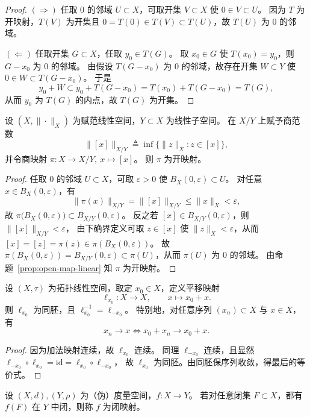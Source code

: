 \documentclass[lang=cn,a4paper,newtx,section]{elegantbook}
\begin{document}
\begin{proof}
  $(\Rightarrow)$ 任取 $0$ 的邻域 $U\subset X$，可取开集 $V\subset X$ 使 $0\in V\subset U$。
  因为 $T$ 为开映射，$T(V)$ 为开集且 $0=T(0)\in T(V)\subset T(U)$，故 $T(U)$ 为 $0$ 的邻域。

  $(\Leftarrow)$ 任取开集 $G\subset X$，任取 $y_0\in T(G)$。
  取 $x_0\in G$ 使 $T(x_0)=y_0$，则 $G-x_0$ 为 $0$ 的邻域。
  由假设 $T(G-x_0)$ 为 $0$ 的邻域，故存在开集 $W\subset Y$ 使 $0\in W\subset T(G-x_0)$。
  于是
  \[
    y_0+W\subset y_0+T(G-x_0)=T(x_0)+T(G-x_0)=T(G),
  \]
  从而 $y_0$ 为 $T(G)$ 的内点，故 $T(G)$ 为开集。
\end{proof}

\begin{corollary}
  设 $(X,\|\cdot\|_X)$ 为赋范线性空间，$Y\subset X$ 为线性子空间。
  在 $X/Y$ 上赋予商范数
  \[
    \|[x]\|_{X/Y}\triangleq \inf\{\|z\|_X: z\in[x]\},
  \]
  并令商映射 $\pi:X\to X/Y,\ x\mapsto[x]$。
  则 $\pi$ 为开映射。
\end{corollary}

\begin{proof}
  任取 $0$ 的邻域 $U\subset X$，可取 $\varepsilon>0$ 使 $B_X(0,\varepsilon)\subset U$。
  对任意 $x\in B_X(0,\varepsilon)$，有
  \[
    \|\pi(x)\|_{X/Y}=\|[x]\|_{X/Y}\le \|x\|_X<\varepsilon,
  \]
  故 $\pi\bigl(B_X(0,\varepsilon)\bigr)\subset B_{X/Y}(0,\varepsilon)$。
  反之若 $[x]\in B_{X/Y}(0,\varepsilon)$，则 $\|[x]\|_{X/Y}<\varepsilon$，
  由下确界定义可取 $z\in[x]$ 使 $\|z\|_X<\varepsilon$，从而 $[x]=[z]=\pi(z)\in\pi(B_X(0,\varepsilon))$。
  故 $\pi(B_X(0,\varepsilon))=B_{X/Y}(0,\varepsilon)\subset \pi(U)$，从而 $\pi(U)$ 为 $0$ 的邻域。
  由命题~\ref{prop:open-map-linear} 知 $\pi$ 为开映射。
\end{proof}
\begin{proposition}
  设 $(X,\tau)$ 为拓扑线性空间，取定 $x_0\in X$，定义平移映射
  \[
    \ell_{x_0}:X\to X,\qquad x\mapsto x_0+x.
  \]
  则 $\ell_{x_0}$ 为同胚，且 $\ell_{x_0}^{-1}=\ell_{-x_0}$。
  特别地，对任意序列 $(x_n)\subset X$ 与 $x\in X$，有
  \[
    x_n\to x \iff x_0+x_n\to x_0+x.
  \]
\end{proposition}

\begin{proof}
  因为加法映射连续，故 $\ell_{x_0}$ 连续。
  同理 $\ell_{-x_0}$ 连续，且显然 $\ell_{-x_0}\circ \ell_{x_0}=\mathrm{id}=\ell_{x_0}\circ \ell_{-x_0}$，
  故 $\ell_{x_0}$ 为同胚。由同胚保序列收敛，得最后的等价式。
\end{proof}

\begin{definition}
  设 $(X,d),(Y,\rho)$ 为（伪）度量空间，$f:X\to Y$。
  若对任意闭集 $F\subset X$，都有 $f(F)$ 在 $Y$ 中闭，则称 $f$ 为闭映射。
\end{definition}
\end{document}
